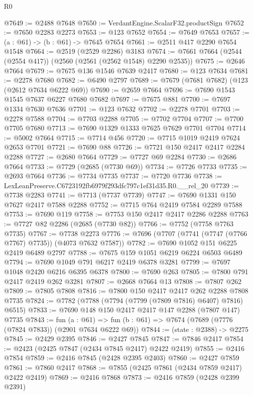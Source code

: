 \begin{lexlean}{R0}
\begin{coremodule}
@7649 := @2488 @7648
@7650 := VerdantEngine.ScalarF32.productSign
@7652 := @7650 @2283 @2273
@7653 := @123 @7652
@7654 := @7649 @7653
@7657 := (a : @61) -> (b : @61) -> @7645 @7654
@7661 := @2511 @417 @2290 @7654 @1548
@7664 := @2519 (@2529 @2286) @3183
@7674 := @7661 @7664 (@2544 (@2554 @417)) (@2560 (@2561 (@2562 @1548) @2290 @2535))
@7675 := @2646 @7664
@7679 := @7675 @136 @1546 @7639 @2417
@7680 := @123 @7634
@7681 := @2278 @7680
@7682 := @6490 @2797
@7689 := @7679 (@7681 @7682) (@123 (@2612 @7634 @6222 @69))
@7690 := @2659 @7664
@7696 := @7690 @1543 @1545 @7637 @6227 @7680 @7682
@7697 := @7675 @881
@7700 := @7697 @1334 @7630 @7636
@7701 := @123 @7632
@7702 := @2278 @7701
@7703 := @2278 @7588
@7704 := @7703 @2288
@7705 := @7702 @7704
@7707 := @7700 @7705 @7680
@7713 := @7690 @1329 @1333 @7625 @7629 @7701 @7704
@7714 := @5002 @7664
@7715 := @7714 @456
@7720 := @7715 @1019 @2419 @7624 @2653 @7701
@7721 := @7690 @88
@7726 := @7721 @150 @2417 @2417 @2284 @2288
@7727 := @2680 @7664
@7729 := @7727 @69 @2284
@7730 := @2686 @7664
@7733 := @7729 (@2685 (@7730 @69))
@7734 := @7726 @7733
@7735 := @2693 @7664
@7736 := @7734 @7735
@7737 := @7720 @7736
@7738 := LexLeanPreserve.C6723192fb6979f293dfc797c1ef31d35.R0.__rel_20
@7739 := @7738 @2283
@7741 := @7713 (@7737 @7739)
@7747 := @7690 @1331 @150 @7627 @2417 @7588 @2288
@7752 := @7715 @764 @2419 @7584 @2289 @7588
@7753 := @7690 @119
@7758 := @7753 @150 @2417 @2417 @2286 @2288
@7763 := @7727 @82 @2286 (@2685 (@7730 @82))
@7766 := @7752 (@7758 @7763 @7735)
@7767 := @7738 @2273
@7776 := @7696 (@7707 (@7741 (@7747 (@7766 @7767) @7735)) (@4073 @7632 @7587))
@7782 := @7690 @1052 @151 @6225 @2419 @6489 @2797
@7788 := @7675 @159 @1051 @6219 @6224 @6503 @6489
@7794 := @7690 @1049 @791 @6217 @2419 @6378 @3281
@7799 := @7697 @1048 @2420 @6216 @6395 @6378
@7800 := @7690 @263
@7805 := @7800 @791 @2417 @2419 @262 @3281
@7807 := @2668 @7664 @13
@7808 := @7807 @262
@7809 := @7805 @7808
@7816 := @7800 @150 @2417 @2417 @262 @2288 @7808 @7735
@7824 := @7782 (@7788 (@7794 (@7799 (@7809 @7816) @6407) @7816) @6515)
@7833 := @7690 @148 @150 @2417 @2417 @147 @2288 (@7807 @147) @7735
@7843 := fun (a : @61) =>
  fun (b : @61) => @7674 (@7689 (@7776 (@7824 @7833)) (@2901 @7634 @6222 @69))
@7844 := (state : @2388) -> @2275
@7845 := @2429 @2395
@7846 := @2427 @7845
@7847 := @7846 @2417
@7854 := @2423 (@2425 @7847 (@2434 @7845 @2417) @2422 @2419)
@7855 := @2416 @7854
@7859 := @2416 @7845 (@2428 @2395 @2403)
@7860 := @2427 @7859
@7861 := @7860 @2417
@7868 := @7855 (@2425 @7861 (@2434 @7859 @2417) @2422 @2419)
@7869 := @2416 @7868
@7873 := @2416 @7859 (@2428 @2399 @2391)

\end{coremodule}
\end{lexlean}
